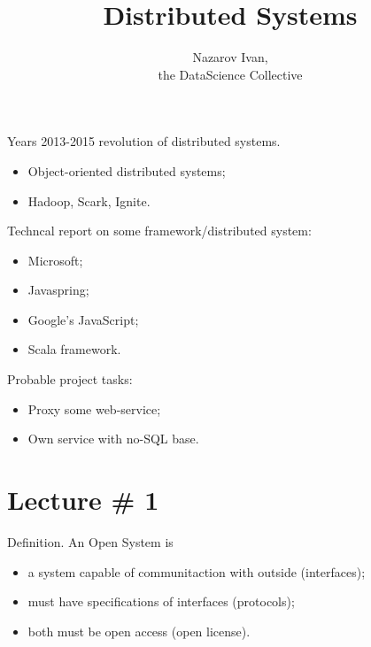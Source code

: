 \documentclass[a4paper]{article}
\title{Distributed Systems}
\author{Nazarov Ivan, \rus{101мНОД(ИССА)}\\the DataScience Collective}
\begin{document}
\maketitle

Years 2013-2015 revolution of distributed systems.
\begin{itemize}
	\item Object-oriented distributed systems;
	\item Hadoop, Scark, Ignite.
\end{itemize}

Techncal report on some framework/distributed system:
\begin{itemize}
	\item Microsoft;
	\item Javaspring;
	\item Google's JavaScript;
	\item Scala framework.
\end{itemize}

Probable project tasks:
\begin{itemize}
	\item Proxy some web-service;
	\item Own service with no-SQL base.
\end{itemize}

\section{Lecture \# 1} %
\label{sec:lecture_#_1}

Definition. An Open System is \begin{itemize}
	\item a system capable of communitaction with outside (interfaces);
	\item must have specifications of interfaces (protocols);
	\item both must be open access (open license).
\end{itemize}



\end{document}

